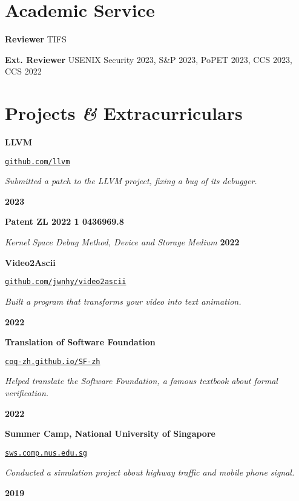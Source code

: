 \documentclass{resume}
\begin{document}
\section{Academic Service}
\begin{content}
	{\bf Reviewer} \enspace TIFS

		{\bf Ext. Reviewer} \enspace USENIX Security 2023, S\&P 2023, PoPET 2023, CCS 2023, CCS 2022
\end{content}

\section{Projects \textbf{\em\&} Extracurriculars}

\begin{content}
	{\bf LLVM} \enspace
	{\href{https://github.com/llvm/}{\texttt{github.com/llvm}}

		{\em Submitted a patch to the LLVM project, fixing a bug of its debugger.} }
	\hfill {\bf 2023}

	{\bf Patent ZL 2022 1 0436969.8}

	{\em Kernel Space Debug Method, Device and Storage Medium}
	\hfill {\bf 2022}

	{\bf Video2Ascii} \enspace
	{\href{https://github.com/jwnhy/video2ascii}{\texttt{github.com/jwnhy/video2ascii}}

		{\em Built a program that transforms your video into text animation.} }
	\hfill {\bf 2022}

	{\bf Translation of Software Foundation} \enspace
	{\href{https://coq-zh.github.io/SF-zh/}{\texttt{coq-zh.github.io/SF-zh}}

		{\em Helped translate the Software Foundation, a famous textbook
			about formal verification.}}
	\hfill {\bf 2022}

	{\bf Summer Camp, National University of Singapore} \enspace
	{\href{https://sws.comp.nus.edu.sg/}{\texttt{sws.comp.nus.edu.sg}}

		{\em Conducted a simulation project about highway traffic and mobile phone
			signal.}}
	\hfill {\bf 2019}



	\sectionlineskip
\end{content}
\end{document}
